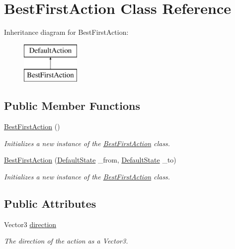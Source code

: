 \hypertarget{class_best_first_action}{\section{Best\-First\-Action Class Reference}
\label{class_best_first_action}
}
Inheritance diagram for Best\-First\-Action\-:\begin{figure}[H]
\begin{center}
\leavevmode
\includegraphics[height=2.000000cm]{class_best_first_action}
\end{center}
\end{figure}
\subsection*{Public Member Functions}
\begin{DoxyCompactItemize}
\item 
\hyperlink{class_best_first_action_ab9494d9bc38a672eb658f9026df0273a}{Best\-First\-Action} ()
\begin{DoxyCompactList}\small\item\em Initializes a new instance of the \hyperlink{class_best_first_action}{Best\-First\-Action} class. \end{DoxyCompactList}\item 
\hyperlink{class_best_first_action_a4bf1317d0be5523c3b6925fc2829ba4d}{Best\-First\-Action} (\hyperlink{class_default_state}{Default\-State} \-\_\-from, \hyperlink{class_default_state}{Default\-State} \-\_\-to)
\begin{DoxyCompactList}\small\item\em Initializes a new instance of the \hyperlink{class_best_first_action}{Best\-First\-Action} class. \end{DoxyCompactList}\end{DoxyCompactItemize}
\subsection*{Public Attributes}
\begin{DoxyCompactItemize}
\item 
\hypertarget{class_best_first_action_a20db99215323f8bb10f7bcbb90c5aa59}{Vector3 \hyperlink{class_best_first_action_a20db99215323f8bb10f7bcbb90c5aa59}{direction}}\label{class_best_first_action_a20db99215323f8bb10f7bcbb90c5aa59}

\begin{DoxyCompactList}\small\item\em The direction of the action as a Vector3. \end{DoxyCompactList}\end{DoxyCompactItemize}


